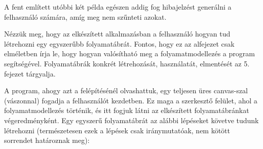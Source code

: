 A fent említett utóbbi két példa egészen addig fog hibajelzést generálni a felhasználó számára, amíg meg nem szűnteti azokat.


Nézzük meg, hogy az elkészített alkalmazásban a felhasználó hogyan tud létrehozni egy egyszerűbb folyamatábrát. Fontos, hogy ez az alfejezet csak elméletben írja le, hogy hogyan valósítható meg a folyamatmodellezés a program segítségével. Folyamatábrák konkrét létrehozását, használatát, elmentését az 5. fejezet tárgyalja.

A program, ahogy azt a felépítésénél olvashattuk, egy teljesen üres canvas-szal (vászonnal) fogadja a felhasználót kezdetben. Ez maga a szerkesztő felület, ahol a folyamatmodellezés történik, és itt fogjuk látni az elkészített folyamatábránkat végeredményként. Egy egyszerű folyamatábrát az alábbi lépéseket követve tudunk létrehozni (természetesen ezek a lépések csak iránymutatóak, nem kötött sorrendet határoznak meg):


